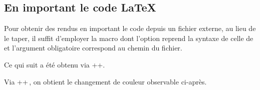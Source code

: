 \documentclass[10pt, a4paper]{../main/main}
\begin{document}
\subsection{En important le code \LaTeX}

Pour obtenir des rendus en important le code depuis un fichier externe, au lieu de le taper, il suffit d'employer la macro  dont l'option reprend la syntaxe de celle de  et l'argument obligatoire correspond au chemin du fichier.


\begin{tdocexa}
    Ce qui suit a été obtenu via \tdocinlatex++.

    \medskip


    \medskip

    Via \tdocinlatex++\,, on obtient le changement de couleur observable ci-après.

    \medskip

\end{tdocexa}
\end{document}
